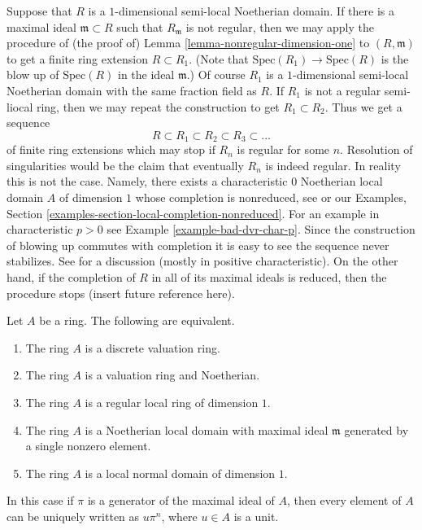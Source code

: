 \begin{remark}
\label{remark-resolution-dim-1}
Suppose that $R$ is a $1$-dimensional semi-local Noetherian domain.
If there is a maximal ideal $\mathfrak m \subset R$ such that
$R_{\mathfrak m}$ is not regular, then we may apply the procedure of
(the proof of) Lemma \ref{lemma-nonregular-dimension-one} to $(R, \mathfrak m)$
to get a finite ring extension $R \subset R_1$.
(Note that $\text{Spec}(R_1) \to \text{Spec}(R)$ is the blow up
of $\text{Spec}(R)$ in the ideal $\mathfrak m$.) Of course $R_1$ is
a $1$-dimensional semi-local Noetherian domain with the same fraction
field as $R$. If $R_1$ is not a regular semi-liocal ring, then
we may repeat the construction to get $R_1 \subset R_2$.
Thus we get a sequence
$$
R \subset R_1 \subset R_2 \subset R_3 \subset \ldots
$$
of finite ring extensions which may stop if $R_n$ is regular for
some $n$. Resolution of singularities would be the claim
that eventually $R_n$ is indeed regular. In reality this is not
the case. Namely, there exists a characteristic $0$
Noetherian local domain $A$ of dimension $1$ whose completion is nonreduced,
see \cite[Proposition 3.1]{Ferrand-Raynaud} or our
Examples, Section \ref{examples-section-local-completion-nonreduced}.
For an example in characteristic $p > 0$ see
Example \ref{example-bad-dvr-char-p}.
Since the construction of blowing up commutes with completion it
is easy to see the sequence never stabilizes.
See \cite{Bennett} for a discussion (mostly in positive characteristic).
On the other hand, if the completion of $R$ in all of its maximal
ideals is reduced, then the procedure stops (insert future reference
here).
\end{remark}

\begin{lemma}
\label{lemma-characterize-dvr}
Let $A$ be a ring. The following are equivalent.
\begin{enumerate}
\item The ring $A$ is a discrete valuation ring.
\item The ring $A$ is a valuation ring and Noetherian.
\item The ring $A$ is a regular local ring of dimension $1$.
\item The ring $A$ is a Noetherian local domain with maximal ideal
$\mathfrak m$ generated by a single nonzero element.
\item The ring $A$ is a local normal domain of dimension $1$.
\end{enumerate}
In this case if $\pi$ is a generator of the maximal ideal of
$A$, then every element of $A$ can be uniquely written as
$u\pi^n$, where $u \in A$ is a unit.
\end{lemma}

